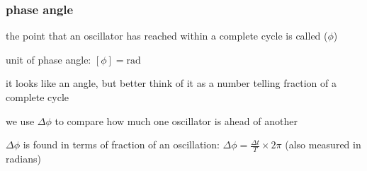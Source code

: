 \subsubsection{phase angle}
the point that an oscillator has reached within a complete cycle is called  ($\phi$)

\cmt unit of phase angle: $[\phi] = \text{rad}$

it looks like an angle, but better think of it as a number telling fraction of a complete cycle

\cmt we use  $\Delta\phi$ to compare how much one oscillator is ahead of another

$\Delta\phi$ is found in terms of fraction of an oscillation: $\Delta\phi = \frac{\Delta t}{T} \times 2\pi $ (also measured in radians)



%
%

